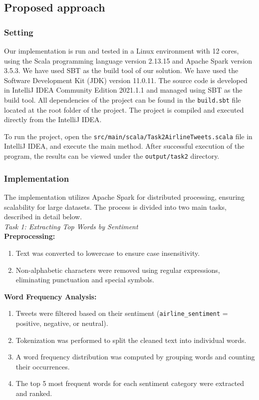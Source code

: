 \documentclass[acmlarge]{acmart}
\begin{document}
  \subsection{Proposed approach}
  \subsubsection{Setting}
  Our implementation is run and tested in a Linux environment with 12 cores, using the Scala programming language version 2.13.15 and Apache Spark version 3.5.3. We have used SBT as the build tool of our solution.
  We have used the Software Development Kit (JDK) version 11.0.11.
  The source code is developed in IntelliJ IDEA Community Edition 2021.1.1 and managed using SBT as the build tool. All dependencies of the project can be found in the \texttt{build.sbt} file located at the root folder of the project.
  The project is compiled and executed directly from the IntelliJ IDEA.

  To run the project, open the \texttt{src/main/scala/Task2AirlineTweets.scala} file in IntelliJ IDEA, and execute the main method. After successful execution of the program, the results can be viewed under the \texttt{output/task2} directory.

  \subsubsection{Implementation}
  The implementation utilizes Apache Spark for distributed processing, ensuring scalability for large datasets. The process is divided into two main tasks, described in detail below.
  \\

  \textit{Task 1: Extracting Top Words by Sentiment}
  \\

  \textbf{Preprocessing:}
  \begin{enumerate}
    \item Text was converted to lowercase to ensure case insensitivity.
    \item Non-alphabetic characters were removed using regular expressions, eliminating punctuation and special symbols.
  \end{enumerate}

  \textbf{Word Frequency Analysis:}
  \begin{enumerate}
    \item Tweets were filtered based on their sentiment (\texttt{airline\_sentiment} = positive, negative, or neutral).
    \item Tokenization was performed to split the cleaned text into individual words.
    \item A word frequency distribution was computed by grouping words and counting their occurrences.
    \item The top 5 most frequent words for each sentiment category were extracted and ranked.
  \end{enumerate}
\end{document}
